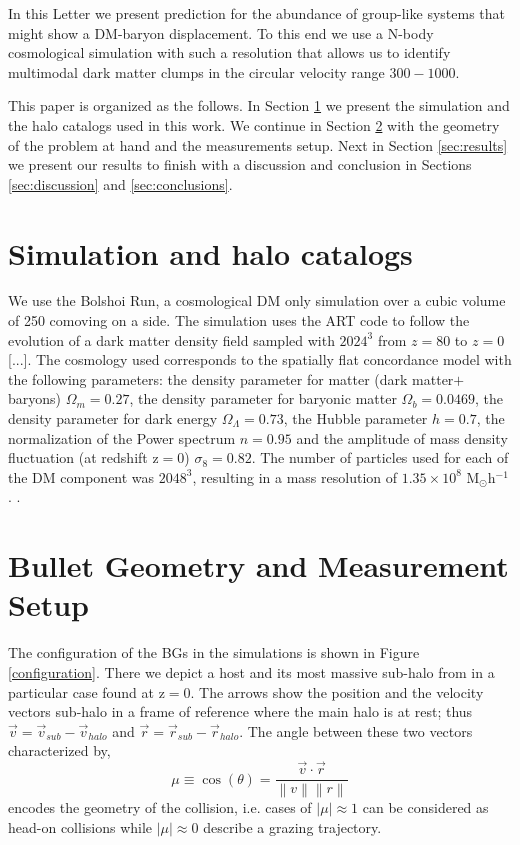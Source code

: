 \documentclass{emulateapj}
\newcommand{\hMpc}{{\ifmmode{h^{-1}{\rm Mpc}}\else{$h^{-1}$Mpc }\fi}}
\newcommand{\kms}{{\ifmmode{{\mathrm{\,km\ s}^{-1}}}\else{\,km~s$^{-1}$}\fi}}
\begin{document}
In this Letter we present prediction for the abundance of group-like
systems that might show a DM-baryon displacement. To this end we use a
N-body cosmological simulation with such a resolution that allows us
to identify multimodal dark matter clumps in the circular velocity
range $300-1000$\kms. 

This paper is organized as the follows. In Section
\ref{sec:simulation} we present the simulation and the halo catalogs
used in this work. We continue in Section \ref{sec:setup} with the
geometry of the problem at hand and the measurements setup. Next in
Section \ref{sec:results} we present our results to finish with a
discussion and conclusion in Sections \ref{sec:discussion} and
\ref{sec:conclusions}. 


\section{Simulation and halo catalogs}
\label{sec:simulation}

We use the Bolshoi Run, a cosmological DM only simulation over a cubic
volume of 250 comoving \hMpc on a side. The simulation uses the ART code to
follow the evolution of  a dark matter density field sampled with
$2024^3$ from $z=80$ to $z=0$ [...]. The cosmology used  corresponds
to  the spatially flat concordance model with the following
parameters:  the density parameter for matter (dark matter$+$baryons)
$\Omega_m=0.27$, the density parameter for baryonic matter
$\Omega_b=0.0469$, the density parameter for dark energy
$\Omega_{\Lambda}=0.73$, the Hubble parameter $h=0.7$, the
normalization of the Power spectrum $n=0.95$ and the amplitude of mass
density fluctuation (at redshift z$=$0) $\sigma_8=0.82$.  The number
of particles used for each of the DM component was $2048^3$, resulting
in a mass resolution of $1.35 \times 10^8$
M$_{\odot}$h$^{-1}$. \citet{2011ApJ...740..102K}.  

\section{Bullet Geometry and Measurement Setup}
\label{sec:setup}

The configuration of the BGs in the simulations is shown in Figure
\ref{configuration}. There we depict a host and its most massive
sub-halo from in a particular case found at z$=0$. The arrows show the
position and the velocity vectors sub-halo in a frame of reference
where the main halo is at rest; thus  $\vec{v{}}=\vec{v}_{sub}-\vec{v}_{halo}$ and
$\vec{r}=\vec{r}_{sub}-\vec{r}_{halo}$.  The angle between these two
vectors characterized by,
\begin{equation}
  \mu\equiv \cos(\theta)=\frac{\vec{v{}}\cdotp{}\vec{r}}{\left\|v{}\right\| \left\|r\right\|}
 \end{equation} 
%
encodes the geometry of the collision, i.e. cases of $|\mu|\approx 1$
can be considered as head-on collisions while $|\mu|\approx 0$
describe a grazing trajectory.
\end{document}
